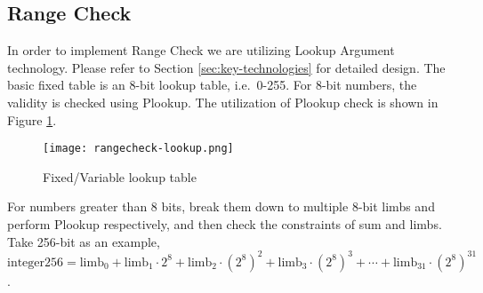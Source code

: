 \subsection{Range Check}

In order to implement Range Check we are utilizing Lookup Argument technology. Please refer to Section \ref{sec:key-technologies} for detailed design. The basic fixed table is an 8-bit lookup table, i.e.\ 0-255. For 8-bit numbers, the validity is checked using Plookup. The utilization of Plookup check is shown in Figure \ref{fig:rangecheck-lookup}.
\begin{figure}[!ht]
    \centering
    \texttt{[image: rangecheck-lookup.png]}
    \caption{Fixed/Variable lookup table}
    \label{fig:rangecheck-lookup}
\end{figure}

For numbers greater than 8 bits, break them down to multiple 8-bit limbs and perform Plookup respectively, and then check the constraints of sum and limbs. Take 256-bit as an example,
$\text{integer256} = \text{limb}_0 + \text{limb}_1 \cdot 2^8 + \text{limb}_2 \cdot (2^8)^2 + \text{limb}_3 \cdot (2^8)^3 + \cdots + \text{limb}_{31} \cdot (2^8)^{31}$.
